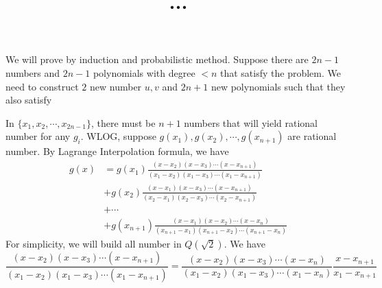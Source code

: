\documentclass[english, 10pt]{article} %
\title{...}
\begin{document}
\maketitle
We will prove by induction and probabilistic method. Suppose there are $2n-1$ numbers and $2n-1$ polynomials with degree $<n$ that satisfy the problem. We need to construct $2$ new number $u,v$ and $2n+1$ new polynomials such that they also satisfy

In $\{x_1,x_2,\cdots,x_{2n-1} \}$, there must be $n+1$ numbers that will yield rational number for any $g_i$. WLOG, suppose $g(x_1),g(x_2),\cdots,g(x_{n+1})$ are rational number. By Lagrange Interpolation formula, we have
\begin{align*}
    g(x) &= g(x_1) \frac{(x-x_2)(x-x_3)\cdots(x-x_{n+1})}{(x_1-x_2)(x_1-x_3)\cdots(x_1-x_{n+1})}\\
    &+g(x_2)\frac{(x-x_1)(x-x_3)\cdots(x-x_{n+1})}{(x_2-x_1)(x_2-x_3)\cdots(x_2-x_{n+1})}\\
    &+\cdots\\
    &+g(x_{n+1})\frac{(x-x_1)(x-x_2)\cdots(x-x_{n})}{(x_{n+1}-x_1)(x_{n+1}-x_2)\cdots(x_{n+1}-x_n)}
\end{align*}
For simplicity, we will build all number in $Q(\sqrt{2})$. We have
$$\frac{(x-x_2)(x-x_3)\cdots(x-x_{n+1})}{(x_1-x_2)(x_1-x_3)\cdots(x_1-x_{n+1})}=\frac{(x-x_2)(x-x_3)\cdots(x-x_{n})}{(x_1-x_2)(x_1-x_3)\cdots(x_1-x_{n})}\frac{x-x_{n+1}}{x_1-x_{n+1}}$$
\end{document}
